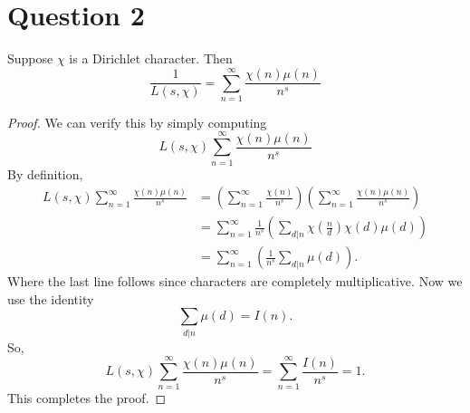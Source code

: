 \documentclass{unswmaths}
\begin{document}
    
    \section*{Question 2}
    \begin{proposition}
        Suppose $\chi$ is a Dirichlet character. Then
        \begin{equation*}
            \frac{1}{L(s,\chi)} = \sum_{n=1}^\infty \frac{\chi(n)\mu(n)}{n^s}
        \end{equation*}
    \end{proposition}
    \begin{proof}
        We can verify this by simply computing 
        \begin{equation*}
            L(s,\chi)\sum_{n=1}^\infty \frac{\chi(n)\mu(n)}{n^s}
        \end{equation*}
        By definition,
        \begin{align*}
            L(s,\chi)\sum_{n=1}^\infty \frac{\chi(n)\mu(n)}{n^s} &= \left(\sum_{n=1}^\infty \frac{\chi(n)}{n^s}\right)\left(\sum_{n=1}^\infty \frac{\chi(n)\mu(n)}{n^s}\right)\\
            &= \sum_{n=1}^\infty \frac{1}{n^s}\left(\sum_{d|n} \chi\left(\frac{n}{d}\right)\chi(d)\mu(d)\right)\\
            &= \sum_{n=1}^\infty \left(\frac{1}{n^s}\sum_{d|n} \mu(d)\right).
        \end{align*}
        Where the last line follows since characters are completely multiplicative. Now we use the identity
        \begin{equation*}
            \sum_{d|n}\mu(d) = I(n).
        \end{equation*}
        So,
        \begin{equation*}
            L(s,\chi)\sum_{n=1}^\infty \frac{\chi(n)\mu(n)}{n^s} = \sum_{n=1}^\infty \frac{I(n)}{n^s} = 1.
        \end{equation*}
        This completes the proof.
    \end{proof}
    
\end{document}
